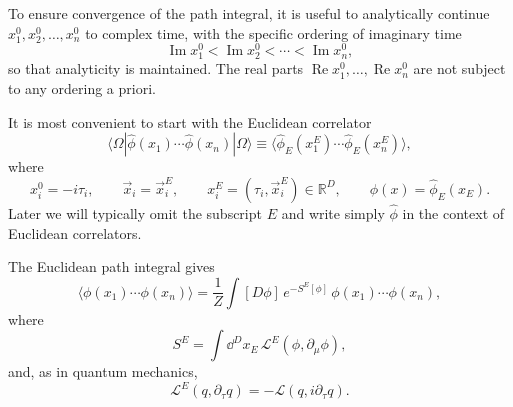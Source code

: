 To ensure convergence of the path integral, it is useful to analytically
continue \(x_1^0,x_2^0,\ldots,x_n^0\) to complex time, with the specific
ordering of imaginary time
\[
  \operatorname{Im}x_1^0
  <
  \operatorname{Im}x_2^0
  <
  \cdots
  <
  \operatorname{Im}x_n^0,
\]
so that analyticity is maintained. The real parts
\(\operatorname{Re}x_1^0,\ldots,\operatorname{Re}x_n^0\) are not subject to
any ordering a priori.

\begin{center}
\end{center}

It is most convenient to start with the Euclidean correlator
\[
  \langle\Omega|
  \hat\phi(x_1)\cdots\hat\phi(x_n)
  |\Omega\rangle
  \equiv
  \langle
  \hat\phi_E(x_1^E)\cdots\hat\phi_E(x_n^E)
  \rangle,
\]
where
\[
  x_i^0=-i\tau_i,
  \qquad
  \vec x_i=\vec x_i^E,
  \qquad
  x_i^E=(\tau_i,\vec x_i^E)\in\mathbb R^D,
  \qquad
  \hat\phi(x)=\hat\phi_E(x_E).
\]
Later we will typically omit the subscript \(E\) and write simply
\(\hat\phi\) in the context of Euclidean correlators.

The Euclidean path integral gives
\[
  \langle \phi(x_1)\cdots\phi(x_n)\rangle
  =
  \frac{1}{Z}
  \int [D\phi]\,
  e^{-S^E[\phi]}\,
  \phi(x_1)\cdots\phi(x_n),
\]
where
\[
  S^E
  =
  \int \dd^D x_E\,
  \mathcal L^E(\phi,\partial_\mu\phi),
\]
and, as in quantum mechanics,
\[
  \mathcal L^E(q,\partial_\tau q)
  =
  -\mathcal L(q,i\partial_\tau q).
\]

